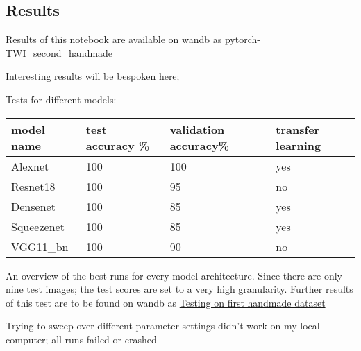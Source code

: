 \documentclass{scrartcl}
\begin{document}
\subsection{Results}

Results of this notebook are available on wandb as \href{https://wandb.ai/dplars/pytorch-TWI_second_handmade?workspace=user-dplars}{pytorch-TWI\_second\_handmade}



Interesting results will be bespoken here;

Tests for different models: 

\begin{tabular}{ |l|l|l|l| }
\hline
 model name & test accuracy \% & validation accuracy\% & transfer learning \tabularnewline
\hline
\hline
 Alexnet & 100 & 100 & yes \tabularnewline
\hline
 Resnet18 & 100 & 95 & no \tabularnewline
\hline
 Densenet & 100 & 85 & yes \tabularnewline
\hline
 Squeezenet & 100 & 85 & yes \tabularnewline
\hline
 VGG11\_bn & 100 & 90 & no \tabularnewline
\hline
\end{tabular}
										

An overview of the best runs for every model architecture. Since there are only nine test images; the test scores are set to a very high granularity. Further results of this test are to be found on wandb as \href{https://wandb.ai/dplars/pytorch-TWI_second_handmade/reports/Testing-on-first-handmade-dataset--VmlldzozNTE5NzM}{Testing on first handmade dataset}





Trying to sweep over different parameter settings didn't work on my local computer; all runs failed or crashed
\end{document}
